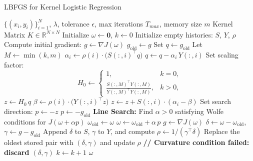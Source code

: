 \documentclass{article}
\begin{document}
\begin{algorithm}[H]
  \caption{LBFGS for Kernel Logistic Regression}
  \begin{algorithmic}[1]
    \Require \(\{(x_i,y_i)\}_{i=1}^N\), \(\lambda\), tolerance \(\epsilon\), max iterations \(T_{max}\), memory size \(m\)
    \Require Kernel Matrix \(K \in \mathbb{R}^{N\times N}\)
    \State Initialize \(\omega \gets \mathbf{0}\), \(k\gets 0\)
    \State Initialize empty histories: \(S\), \(Y\), \(\rho\)
    \State Compute initial gradient: \(g \gets \nabla J(\omega)\)
    \Repeat
        \State \(g_{\text{old}} \gets g\)
        \State Set \(q \gets g_{\text{old}}\)
        \State Let \(M \gets \min(k, m)\)
            \State \(\alpha_i \gets \rho(i) \cdot \bigl(S(:,i)^\top q\bigr)\)
            \State \(q \gets q - \alpha_i\, Y(:,i)\)
        \EndFor
        \State Set scaling factor: 
        \[
          H_0 \gets \begin{cases}
            1, & k=0,\\[1mm]
            \frac{S(:,M)^\top Y(:,M)}{Y(:,M)^\top Y(:,M)}, & k>0,
          \end{cases}
        \]
        \State \(z \gets H_0 \, q\)
            \State \(\beta \gets \rho(i) \cdot \bigl(Y(:,i)^\top z\bigr)\)
            \State \(z \gets z + S(:,i) \cdot (\alpha_i - \beta)\)
        \EndFor
        \State Set search direction: \(p \gets -z\)
            \State \(p \gets -g_{\text{old}}\) 
        \EndIf
        \State \textbf{Line Search:} Find \(\alpha > 0\) satisfying Wolfe conditions for \(J(\omega + \alpha p)\)
        \State \(\omega_{\text{old}} \gets \omega\)
        \State \(\omega \gets \omega_{\text{old}} + \alpha\,p\)
        \State \(g \gets \nabla J(\omega)\)
        \State \(\delta \gets \omega - \omega_{\text{old}}\), \quad \(\gamma \gets g - g_{\text{old}}\)
                \State Append \(\delta\) to \(S\), \(\gamma\) to \(Y\), and compute \(\rho \gets 1/(\gamma^\top\delta)\)
            \Else
                \State Replace the oldest stored pair with \((\delta, \gamma)\) and update \(\rho\)
            \EndIf
        \Else
            \State \textbf{// Curvature condition failed: discard \((\delta,\gamma)\)}
        \EndIf
        \State \(k \gets k+1\)
    \State \Return \(\omega\)
  \end{algorithmic}
\end{algorithm}
  
\end{document}
